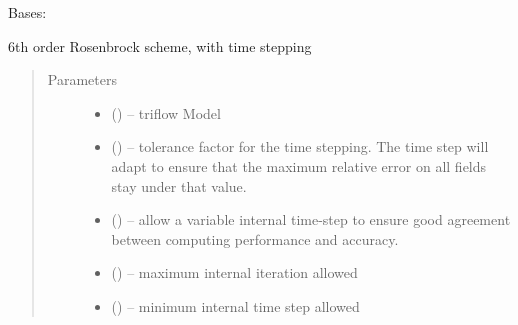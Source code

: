 \documentclass[letterpaper,10pt,english]{sphinxmanual}
\begin{document}
\begin{fulllineitems}
\label{\detokenize{triflow.plugins:triflow.plugins.schemes.RODASPR}}
Bases: {\hyperref[\detokenize{triflow.plugins:triflow.plugins.schemes.ROW_general}]{}}

6th order Rosenbrock scheme, with time stepping
\begin{quote}\begin{description}
\item[{Parameters}] \leavevmode\begin{itemize}
\item {} 
 () -- triflow Model

\item {} 
 (\sphinxstyleliteralemphasis{, }\sphinxstyleliteralemphasis{, }) -- tolerance factor for the time stepping. The time step will adapt to ensure that the maximum relative error on all fields stay under that value.

\item {} 
 (\sphinxstyleliteralemphasis{, }\sphinxstyleliteralemphasis{, }) -- allow a variable internal time-step to ensure good agreement between computing performance and accuracy.

\item {} 
 (\sphinxstyleliteralemphasis{, }\sphinxstyleliteralemphasis{, }) -- maximum internal iteration allowed

\item {} 
 (\sphinxstyleliteralemphasis{, }\sphinxstyleliteralemphasis{, }) -- minimum internal time step allowed

\end{itemize}

\end{description}\end{quote}

\end{fulllineitems}
\end{document}

